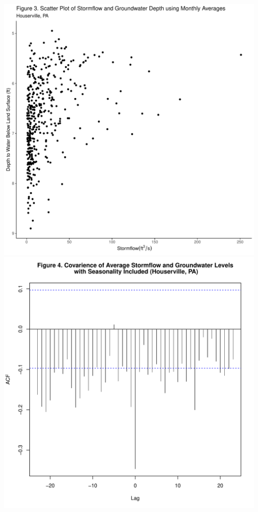\documentclass[
  12pt,
]{article}
\begin{document}
\includegraphics{Draft_Final_files/figure-latex/groundwater_lag-1.pdf}
\includegraphics{Draft_Final_files/figure-latex/groundwater_lag-2.pdf}
\end{document}
